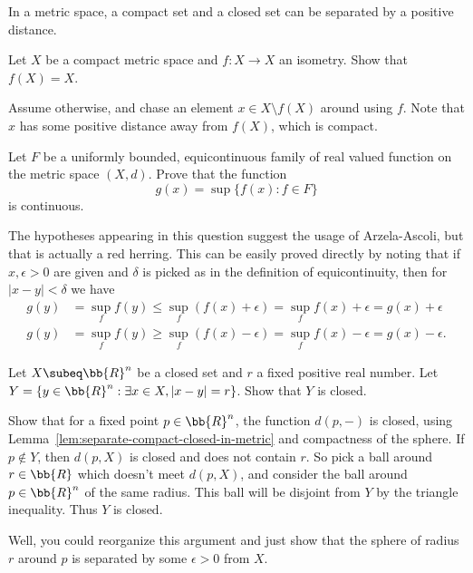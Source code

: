 \begin{lem}\label{lem:separate-compact-closed-in-metric}
	In a metric space, a compact set and a closed set can be separated by a positive distance.
\end{lem}

\begin{problem}
	Let $X$ be a compact metric space and $f\colon X\to X$ an isometry. Show that $f(X)=X$.
\end{problem}
\begin{solution}
	Assume otherwise, and chase an element $x\in X\setminus f(X)$ around using $f$. Note that $x$ has some positive distance away from $f(X)$, which is compact.
\end{solution}

\begin{problem}
	Let $F$ be a uniformly bounded, equicontinuous family of real valued function on the metric space $(X,d)$. Prove that the function
	\[
		g(x) = \sup\{f(x) : f\in F\}
	\]
	is continuous.
\end{problem}
\begin{solution}
	The hypotheses appearing in this question suggest the usage of Arzela-Ascoli, but that is actually a red herring. This can be easily proved directly by noting that if $x, \epsilon > 0$ are given and $\delta$ is picked as in the definition of equicontinuity, then for $|x-y| < \delta$ we have
	\begin{align*}
		g(y) &= \sup_f f(y) \leq \sup_f (f(x) + \epsilon) = \sup_f f(x) + \epsilon = g(x) + \epsilon\\
		g(y) &= \sup_f f(y) \geq \sup_f (f(x) - \epsilon) = \sup_f f(x) - \epsilon = g(x) - \epsilon.
	\end{align*}
\end{solution}

\begin{problem}
	Let $X \subeq \bb{R}^n$ be a closed set and $r$ a fixed positive real number. Let $Y = \{y\in \bb{R}^n : \exists x\in X, |x-y| = r\}$. Show that $Y$ is closed.
\end{problem}
\begin{solution}
	Show that for a fixed point $p\in \bb{R}^n$, the function $d(p,-)$ is closed, using Lemma~\ref{lem:separate-compact-closed-in-metric} and compactness of the sphere. If $p \notin Y$, then $d(p,X)$ is closed and does not contain $r$. So pick a ball around $r \in \bb{R}$ which doesn't meet $d(p,X)$, and consider the ball around $p \in \bb{R}^n$ of the same radius. This ball will be disjoint from $Y$ by the triangle inequality. Thus $Y$ is closed.
	
	Well, you could reorganize this argument and just show that the sphere of radius $r$ around $p$ is separated by some $\epsilon > 0$ from $X$.
\end{solution}